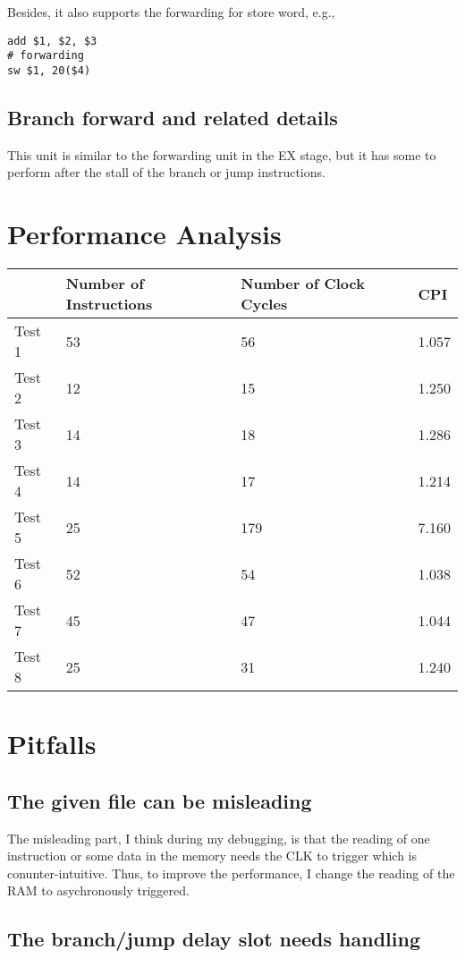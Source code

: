 \documentclass[
]{article}
\begin{document}
Besides, it also supports the forwarding for store word, e.g.,

\begin{verbatim}
add $1, $2, $3
# forwarding
sw $1, 20($4)
\end{verbatim}

\hypertarget{header-n126}{%
\subsection{Branch forward and related details}\label{header-n126}}

This unit is similar to the forwarding unit in the EX stage, but it has
some to perform after the stall of the branch or jump instructions.

\hypertarget{header-n66}{%
\section{Performance Analysis}\label{header-n66}}

\begin{longtable}[]{@{}llll@{}}
\toprule
& Number of Instructions & Number of Clock Cycles & CPI\tabularnewline
\midrule
\endhead
Test 1 & 53 & 56 & 1.057\tabularnewline
Test 2 & 12 & 15 & 1.250\tabularnewline
Test 3 & 14 & 18 & 1.286\tabularnewline
Test 4 & 14 & 17 & 1.214\tabularnewline
Test 5 & 25 & 179 & 7.160\tabularnewline
Test 6 & 52 & 54 & 1.038\tabularnewline
Test 7 & 45 & 47 & 1.044\tabularnewline
Test 8 & 25 & 31 & 1.240\tabularnewline
\bottomrule
\end{longtable}

\hypertarget{header-n34}{%
\section{Pitfalls}\label{header-n34}}

\hypertarget{header-n10}{%
\subsection{The given file can be misleading}\label{header-n10}}

The misleading part, I think during my debugging, is that the reading of
one instruction or some data in the memory needs the CLK to trigger
which is conunter-intuitive. Thus, to improve the performance, I change
the reading of the RAM to asychronously triggered.

\hypertarget{header-n37}{%
\subsection{The branch/jump delay slot needs
handling}\label{header-n37}}
\end{document}
